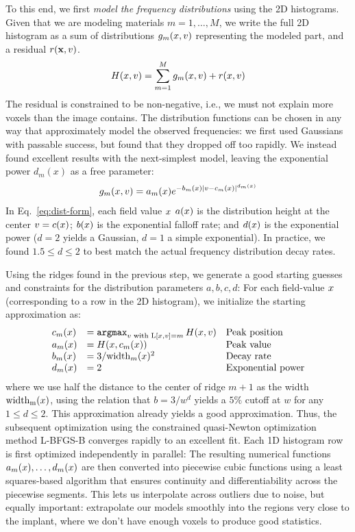 To this end, we first {\it model the frequency distributions} using the 2D
histograms. Given that we are modeling materials $m=1,\ldots,M$, we write the
full 2D histogram as a sum of distributions $g_m(x,v)$ representing the
modeled part, and a residual $r(\mathbf{x},v)$.
\begin{equation}
  \label{eq:hist}
  H(x,v) = \sum_{m=1}^M g_m(x,v) + r(x,v)
\end{equation}
The residual is constrained to be non-negative, i.e., we must not explain more
voxels than the image contains. The distribution functions can be chosen in any
way that approximately model the observed frequencies: we first used Gaussians
with passable success, but found that they dropped off too rapidly. We instead
found excellent results with the next-simplest model, leaving the exponential
power $d_m(x)$ as a free parameter:
\begin{equation}
  \label{eq:dist-form}
  g_m(x,v) = a_m(x) e^{-b_m(x) \vert v-c_m(x)\vert^{d_m(x)}}
\end{equation}
In Eq.~\eqref{eq:dist-form}, each field value $x$ $a(x)$ is the
distribution height at the center $v=c(x)$; $b(x)$ is the exponential
falloff rate; and $d(x)$ is the exponential power ($d=2$ yields a Gaussian,
$d=1$ a simple exponential). In practice, we found $1.5\le d \le 2$ to best
match the actual frequency distribution decay rates.

Using the ridges found in the previous step, we generate a good starting
guesses and constraints for the distribution parameters $a,b,c,d$: For each
field-value $x$ (corresponding to a row in the 2D histogram), we initialize
the starting approximation as:
\begin{equation}
  \label{eq:starting-guesses}
  \begin{array}{lll}
    c_m(x) &= \mathop{\mathtt{argmax}}_{v \text{ with }\mathrm{L}[x,v] = m} H(x,v)  & \text{Peak position}  \\
    a_m(x) &= H(x,c_m(x)) & \text{Peak value}\\
    b_m(x) &= 3/\mathrm{width}_m(x)^2  & \text{Decay rate}\\
    d_m(x) &= 2 & \text{Exponential power}
  \end{array}
\end{equation}
where we use half the distance to the center of ridge $m+1$ as the width
$\mathrm{width_m}(x)$, using the relation that $b = 3/w^d$ yields a $5\%$
cutoff at $w$ for any $1\le d \le 2$. This approximation already yields a good
approximation. Thus, the subsequent optimization using the constrained
quasi-Newton optimization method L-BFGS-B\cite{BFGS} converges rapidly to an
excellent fit. Each 1D histogram row is first optimized independently in
parallel: The resulting numerical functions $a_m(x),\ldots,d_m(x)$ are
then converted into piecewise cubic functions using a least squares-based
algorithm that ensures continuity and differentiability across the piecewise
segments. This lets us interpolate across outliers due to noise, but equally
important: extrapolate our models smoothly into the regions very close to the
implant, where we don't have enough voxels to produce good statistics.

